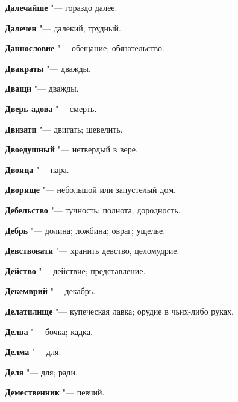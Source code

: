 \begin{mymulticols}{2}
\noindent\textbf{Далечайше} "--- гораздо далее. 




\noindent\textbf{Далечен} "--- далекий; трудный. 




\noindent\textbf{Даннословие} "--- обещание; обязательство. 




\noindent\textbf{Двакраты} "--- дважды. 




\noindent\textbf{Дващи} "--- дважды. 




\noindent\textbf{Дверь адова} "--- смерть. 




\noindent\textbf{Двизати} "--- двигать; шевелить. 




\noindent\textbf{Двоедушный} "--- нетвердый в вере. 




\noindent\textbf{Двоица} "--- пара. 




\noindent\textbf{Дворище} "--- небольшой или запустелый дом. 




\noindent\textbf{Дебельство} "--- тучность; полнота; дородность. 




\noindent\textbf{Дебрь} "--- долина; ложбина; овраг; ущелье. 




\noindent\textbf{Девствовати} "--- хранить девство, целомудрие. 




\noindent\textbf{Действо} "--- действие; представление. 




\noindent\textbf{Декемврий} "--- декабрь. 




\noindent\textbf{Делатилище} "--- купеческая лавка; орудие в чьих-либо руках. 




\noindent\textbf{Делва} "--- бочка; кадка. 




\noindent\textbf{Делма} "--- для. 




\noindent\textbf{Деля} "--- для; ради. 




\noindent\textbf{Демественник} "--- певчий. 





\end{mymulticols}
